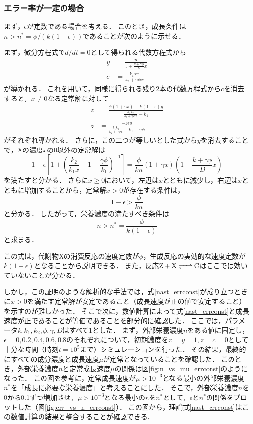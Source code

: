 \subsubsection{エラー率が一定の場合}
まず，$\epsilon$が定数である場合を考える．
このとき，成長条件は$n > n^* = \phi/(k(1-\epsilon))$であることが次のように示せる．

まず，微分方程式で$d/dt=0$として得られる代数方程式から
\begin{align}
  y &= \frac{n}{1+\frac{k+\gamma\phi}{D}x} \\
  c &= \frac{k_1xz}{k_2+\gamma\phi x}
\end{align}
が導かれる．
これを用いて，同様に得られる残り2本の代数方程式から$c$を消去すると，$x\neq 0$なる定常解に対して
\begin{align}
  z &= \frac{\phi(1+\gamma x) - k(1-\epsilon)y}{\frac{k_1k_2}{k_2+\gamma\phi x} - k_1} \\
  z &= \frac{-k\epsilon y}{\frac{k_1k_2}{k_2+\gamma\phi x} - k_1 - \gamma\phi}
\end{align}
がそれぞれ導かれる．
さらに，この二つが等しいとした式から$y$を消去することで，Xの濃度$x$の0以外の定常解は
\begin{equation}
  1-\epsilon \left[1 + \left(\frac{k_2}{k_1 x} + 1 - \frac{\gamma \phi}{k_1}\right)^{-1} \right] = \frac{\phi}{kn}(1+\gamma x)\left(1+\frac{k+\gamma\phi}{D}x\right)
\end{equation}
を満たすと分かる．
さらに$x \ge 0$において，左辺は$x$とともに減少し，右辺は$x$とともに増加することから，定常解$x>0$が存在する条件は，
\begin{equation}
  1-\epsilon > \frac{\phi}{kn}
\end{equation}
と分かる．
したがって，栄養濃度の満たすべき条件は
\begin{equation}
  n > n^* = \frac{\phi}{k(1-\epsilon)} \label{nast_errconst}
\end{equation}
と求まる．

この式は，代謝物Xの消費反応の速度定数が$\phi$，生成反応の実効的な速度定数が$k(1-\epsilon)$となることから説明できる．
また，反応$\ce{Z + X <=> C}$はここでは効いていないことが分かる．

しかし，この証明のような解析的な手法では，式\eqref{nast_errconst}が成り立つときに$x>0$を満たす定常解が安定であること（成長速度が正の値で安定すること）を示すのが難しかった．
そこで次に，数値計算によって式\eqref{nast_errconst}と成長速度が正であることが等価であることを部分的に確認した．
ここでは，パラメータ$k,k_1,k_2,\phi,\gamma,D$はすべて1とした．
まず，外部栄養濃度$n$をある値に固定し，$\epsilon=0,0.2,0.4,0.6,0.8$のそれぞれについて，初期濃度を$x=y=1, z=c=0$として十分な時間（時刻$t=10^5$まで）シミュレーションを行った．
その結果，最終的にすべての成分濃度と成長速度$\mu$が定常となっていることを確認した．
このとき，外部栄養濃度$n$と定常成長速度$\mu$の関係は図\ref{fig:n_vs_mu_errconst}のようになった．
この図を参考に，定常成長速度が$\mu > 10^{-3}$となる最小の外部栄養濃度$n^*$を「成長に必要な栄養濃度」と考えることにした．
そこで，外部栄養濃度$n$を0から0.1ずつ増加させ，$\mu>10^{-3}$となる最小の$n$を$n^*$として，$\epsilon$と$n^*$の関係をプロットした（図\ref{fig:err_vs_n_errconst}）．
この図から，理論式\eqref{nast_errconst}はこの数値計算の結果と整合することが確認できる．

